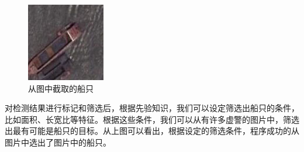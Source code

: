 \begin{figure}[H]
\begin{minipage}{0.3\linewidth}
	\end{minipage}
	\begin{minipage}{0.3\linewidth}
		\includegraphics[width=\linewidth]{figure/bridge_50_cutted_object_1.png}
	\end{minipage}
	\caption{从图中截取的船只}
\end{figure}
对检测结果进行标记和筛选后，根据先验知识，我们可以设定筛选出船只的条件，比如面积、长宽比等特征。根据这些条件，我们可以从有许多虚警的图片中，筛选出最有可能是船只的目标。从上图可以看出，根据设定的筛选条件，程序成功的从图片中选出了图片中的船只。